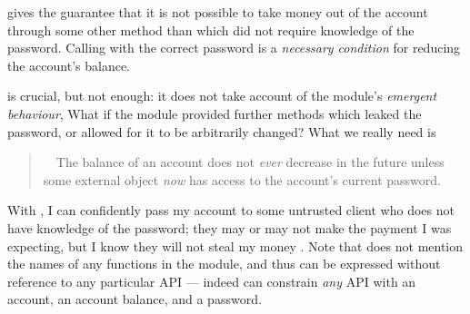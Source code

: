 \SrobustA gives   the guarantee that it is not possible to  take money out of the account through some other method than  which did not
 require knowledge of the password.
  Calling   with the  correct password is 
a \emph{necessary condition} for reducing the account's  balance.

\SrobustA is  crucial, but  not   enough:
it does not take  account of the module's \emph{emergent behaviour},
 What if the module provided further methods which leaked the password,  
 {or allowed for it to be arbitrarily changed}?
{What} we really need is
 \begin{quote}
\SrobustB\  \ The balance of an account does not {\emph{ever}} decrease in the future unless some external 
object  {\emph{now}} has access to the account's current password.
\end{quote}
With \SrobustB, I can confidently pass my account to some untrusted client who
 does not have
 knowledge of the password; they may or may not make the payment I was expecting, but I
 know they will not  steal my money \cite{ooToSecurity,miller-esop2013}.
 Note that \SrobustB  does not mention
 the names of any functions in the module, and 
 thus can be expressed without reference to any particular API ---
 indeed \SrobustB can constrain \emph{any} API with an account, an account
 balance, and a password.
 
 
 

